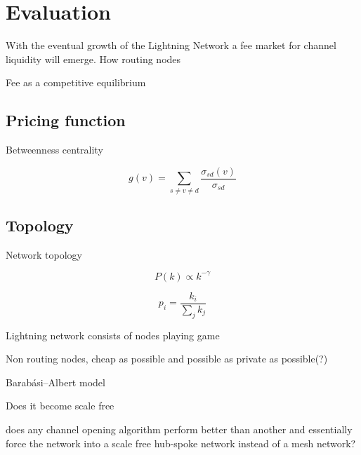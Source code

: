 \chapter{Evaluation}

With the eventual growth of the Lightning Network a fee market for channel liquidity will emerge. How routing nodes 


Fee as a competitive equilibrium 

\section{Pricing function}

Betweenness centrality

\[ g(v) = \sum_{s \neq v \neq d}\frac{\sigma_{sd}(v)}{\sigma_{sd}} \]

\section{Topology}

Network topology

\[ P(k) \propto k^{-\gamma} \]

\[ p_i = \dfrac{k_i}{\sum_{j}^{}k_j}  \]


Lightning network consists of nodes playing game

Non routing nodes, cheap as possible and possible as private as possible(?) 

Barabási–Albert model

Does it become scale free

does any channel opening algorithm perform better than another and essentially force the network into a scale free hub-spoke network instead of a mesh network?







